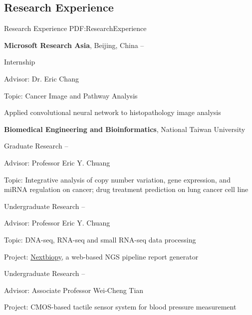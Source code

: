 \documentclass[a4paper,12pt,oneside]{article}
\begin{document}
\begin{body}

\section{Research Experience}
{Research Experience}
{PDF:ResearchExperience}

\textbf{Microsoft Research Asia},
Beijing, China
\hfill
{} --
\par
Internship
\begin{detail}
    \begin{detailitem}
    \item Advisor: Dr. Eric Chang
    \item Topic: Cancer Image and Pathway Analysis
    \item Applied convolutional neural network to histopathology image analysis
    \end{detailitem}
\end{detail}


\BigEntryGapNoBreak
\textbf{Biomedical Engineering and Bioinformatics},
National Taiwan University
\par
Graduate Research
\hfill
{} --
\begin{detailitem}
    \item Advisor: Professor Eric Y. Chuang
    \item Topic: Integrative analysis of copy number variation, gene expression, and miRNA regulation on cancer; drug treatment prediction on lung cancer cell line
\end{detailitem}


\EntryGapNoBreak
Undergraduate Research%
\hfill
{} --
\begin{detail}
    \begin{detailitem}
    \item Advisor: Professor Eric Y. Chuang
    \item Topic: DNA-seq, RNA-seq and small RNA-seq data processing
    \item Project: \href{https://github.com/BioCloud-TW/nextbiopy}{Nextbiopy}, a web-based NGS pipeline report generator
    \end{detailitem}
\end{detail}

\EntryGapNoBreak
Undergraduate Research%
\hfill
{} --
\begin{detail}
    \begin{detailitem}
    \item Advisor: Associate Professor Wei-Cheng Tian
    \item Project: CMOS-based tactile sensor system for blood pressure measurement
    \end{detailitem}
\end{detail}


\end{body}
\end{document}

